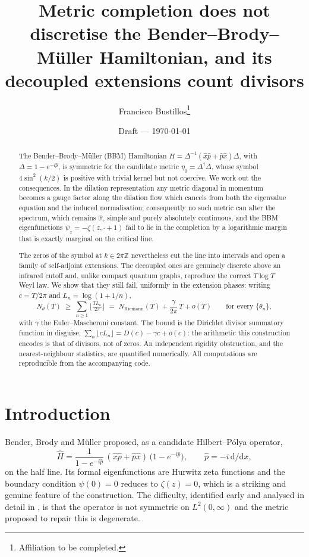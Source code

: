 \documentclass[11pt,a4paper]{article}
\title{Metric completion does not discretise the Bender--Brody--M\"uller
Hamiltonian, and its decoupled extensions count divisors}
\author{Francisco Bustillos\thanks{Affiliation to be completed.}}
\date{Draft --- \today}
\theoremstyle{remark}
\newcommand{\R}{\mathbb{R}}
\newcommand{\Z}{\mathbb{Z}}
\newcommand{\dd}{\mathrm{d}}
\begin{document}
\maketitle

\begin{abstract}
The Bender--Brody--M\"uller (BBM) Hamiltonian $H=\Delta^{-1}(\hat x\hat p+\hat p\hat x)\Delta$,
with $\Delta=1-e^{-i\hat p}$, is symmetric for the candidate metric
$\eta_0=\Delta^\dagger\Delta$, whose symbol $4\sin^2(k/2)$ is positive with trivial kernel but
not coercive. We work out the consequences. In the dilation representation any metric diagonal in
momentum becomes a gauge factor along the dilation flow which cancels from both the eigenvalue
equation and the induced normalisation; consequently no such metric can alter the spectrum, which
remains $\R$, simple and purely absolutely continuous, and the BBM eigenfunctions
$\psi_z=-\zeta(z,\cdot+1)$ fail to lie in the completion by a logarithmic margin that is exactly
marginal on the critical line.

The zeros of the symbol at $k\in2\pi\Z$ nevertheless cut the line into intervals and open a family
of self-adjoint extensions. The decoupled ones are genuinely discrete above an infrared cutoff and,
unlike compact quantum graphs, reproduce the correct $T\log T$ Weyl law. We show that they still
fail, uniformly in the extension phases: writing $c=T/2\pi$ and $L_n=\log(1+1/n)$,
\[
N_\theta(T)\;\ge\;\sum_{n\ge1}\Big\lfloor \tfrac{T L_n}{2\pi}\Big\rfloor
\;=\;N_{\mathrm{Riemann}}(T)+\frac{\gamma}{2\pi}\,T+o(T)
\qquad\text{for every }\{\theta_n\},
\]
with $\gamma$ the Euler--Mascheroni constant. The bound is the Dirichlet divisor summatory
function in disguise, $\sum_{n}\lfloor cL_n\rfloor=D(c)-\gamma c+o(c)$: the arithmetic this
construction encodes is that of divisors, not of zeros. An independent rigidity obstruction, and
the nearest-neighbour statistics, are quantified numerically. All computations are reproducible
from the accompanying code.
\end{abstract}

\section{Introduction}

Bender, Brody and M\"uller \cite{BBM2017} proposed, as a candidate Hilbert--P\'olya operator,
\begin{equation}\label{eq:BBM}
\hat H=\frac{1}{1-e^{-i\hat p}}\,(\hat x\hat p+\hat p\hat x)\,\bigl(1-e^{-i\hat p}\bigr),
\qquad \hat p=-i\,\dd/\dd x ,
\end{equation}
on the half line. Its formal eigenfunctions are Hurwitz zeta functions and the boundary condition
$\psi(0)=0$ reduces to $\zeta(z)=0$, which is a striking and genuine feature of the construction.
The difficulty, identified early \cite{Bellissard2017} and analysed in detail in
\cite{Liu2026}, is that the operator is not symmetric on $L^2(0,\infty)$ and the metric proposed
to repair this is degenerate.
\end{document}
